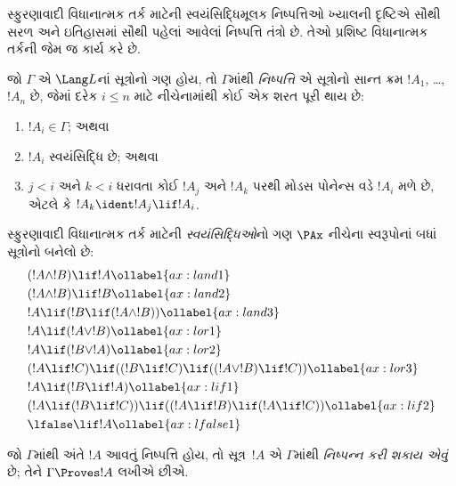 \begingroup
\makeatletter{}\makeatother


\label{guunit:OLP-0497}


સ્ફુરણાવાદી વિધાનાત્મક તર્ક માટેની સ્વયંસિદ્ધિમૂલક
નિષ્પત્તિઓ ખ્યાલની દૃષ્ટિએ સૌથી સરળ અને ઇતિહાસમાં
સૌથી પહેલાં આવેલાં નિષ્પત્તિ તંત્રો છે. તેઓ પ્રશિષ્ટ
વિધાનાત્મક તર્કની જેમ જ કાર્ય કરે છે.

\begin{defn}[નિષ્પન્નક્ષમતા]
જો $\Gamma$ એ $\Lang L$નાં સૂત્રોનો ગણ હોય, તો
$\Gamma$માંથી \emph{નિષ્પત્તિ} એ સૂત્રોનો
સાન્ત ક્રમ $!A_1$, \dots,~$!A_n$ છે, જેમાં દરેક $i \le n$
માટે નીચેનામાંથી કોઈ એક શરત પૂરી થાય છે:
\begin{enumerate}
\item $!A_i \in \Gamma$; અથવા
\item $!A_i$ સ્વયંસિદ્ધિ છે; અથવા
\item $j < i$ અને $k < i$ ધરાવતા કોઈ $!A_j$ અને $!A_k$
  પરથી મોડસ પોનેન્સ વડે $!A_i$ મળે છે, એટલે કે
  $!A_k \ident !A_j \lif !A_i$.
\end{enumerate}
\end{defn}

\begin{defn}[સ્વયંસિદ્ધિઓ]
સ્ફુરણાવાદી વિધાનાત્મક તર્ક માટેની \emph{સ્વયંસિદ્ધિઓ}નો ગણ
$\PAx$ નીચેના સ્વરૂપોનાં બધાં સૂત્રોનો બનેલો છે:
\begin{align}
  & (!A \land !B) \lif !A \ollabel{ax:land1}\\
  & (!A \land !B) \lif !B \ollabel{ax:land2}\\
  & !A \lif (!B \lif (!A \land !B)) \ollabel{ax:land3}\\
  & !A \lif (!A \lor !B) \ollabel{ax:lor1}\\
  & !A \lif (!B \lor !A) \ollabel{ax:lor2}\\
  & (!A \lif !C) \lif ((!B \lif !C) \lif ((!A \lor !B) \lif !C)) \ollabel{ax:lor3}\\
  & !A \lif (!B \lif !A) \ollabel{ax:lif1}\\
  & (!A \lif (!B \lif !C)) \lif ((!A \lif !B) \lif (!A \lif !C)) \ollabel{ax:lif2}\\
  & \lfalse \lif !A \ollabel{ax:lfalse1}
\end{align}
\end{defn}

\begin{defn}[નિષ્પન્નક્ષમતા]
જો $\Gamma$માંથી અંતે $!A$ આવતું નિષ્પત્તિ હોય, તો
સૂત્ર~$!A$ એ $\Gamma$માંથી \emph{નિષ્પન્ન કરી શકાય એવું}
છે; તેને $\Gamma \Proves !A$ લખીએ છીએ.
\end{defn}

